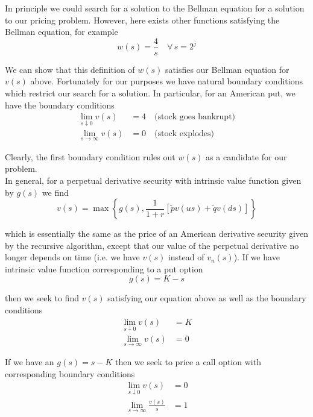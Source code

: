 \documentclass[12pt]{article}
\newlength\tindent
\renewcommand{\indent}{\hspace*{\tindent}}
\begin{document}
\indent In principle we could search for a solution to the Bellman equation for a solution to our pricing problem. However, here exists other functions satisfying the Bellman equation, for example
\begin{equation*}
	w(s) = \frac{4}{s} \quad \forall\, s = 2^j
\end{equation*}

\indent We can show that this definition of $w(s)$ satisfies our Bellman equation for $v(s)$ above. Fortunately for our purposes we have natural boundary conditions which restrict our search for a solution. In particular, for an American put, we have the boundary conditions
\begin{align*}
	\lim_{s\downarrow 0} v(s) &= 4 \quad \text{(stock goes bankrupt)} \\
	\lim_{s\to\infty} v(s) &= 0 \quad \text{(stock explodes)}
\end{align*}

Clearly, the first boundary condition rules out $w(s)$ as a candidate for our problem. \\

\indent In general, for a perpetual derivative security with intrinsic value function given by $g(s)$ we find 
\begin{equation*}
	v(s) = \max \left\{ g(s), \frac{1}{1 + r} \left[ \tilde{p}v(us) + \tilde{q}v(ds) \right]  \right\}
\end{equation*}

which is essentially the same as the price of an American derivative security given by the recursive algorithm, except that our value of the perpetual derivative no longer depends on time (i.e. we have $v(s)$ instead of $v_n(s)$). If we have intrinsic value function corresponding to a put option
\begin{equation*}
	g(s) = K - s
\end{equation*}

then we seek to find $v(s)$ satisfying our equation above as well as the boundary conditions
\begin{align*}
	\lim_{s\downarrow 0} v(s) &= K \\
	\lim_{s\to\infty} v(s) &= 0 
\end{align*}

\indent If we have an $g(s) = s - K$ then we seek to price a call option with corresponding boundary conditions
\begin{align*}
	\lim_{s\downarrow 0} v(s) &= 0 \\
	\lim_{s\to\infty} \frac{v(s)}{s} &= 1
\end{align*}
\end{document}
